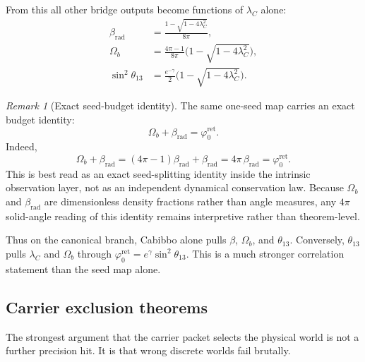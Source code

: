\documentclass[11pt,a4paper]{article}
\theoremstyle{definition}
\theoremstyle{remark}
\newtheorem*{remark}{Remark}
\newcommand{\phiz}{\varphi_0^{\mathrm{ret}}}
\begin{document}
From this all other bridge outputs become functions of $\lambda_C$ alone:
\begin{equation}
\label{eq:lambda-c-master}
\begin{aligned}
\beta_{\mathrm{rad}}&=\frac{1-\sqrt{1-4\lambda_C^2}}{8\pi},\\
\Omega_b&=\frac{4\pi-1}{8\pi}\bigl(1-\sqrt{1-4\lambda_C^2}\bigr),\\
\sin^2\theta_{13}&=\frac{e^{-\gamma}}{2}\bigl(1-\sqrt{1-4\lambda_C^2}\bigr).
\end{aligned}
\end{equation}
\begin{remark}[Exact seed-budget identity]
The same one-seed map carries an exact budget identity:
\begin{equation}
\label{eq:seed-budget-identity}
\Omega_b+\beta_{\mathrm{rad}}=\phiz.
\end{equation}
Indeed,
\[
\Omega_b+\beta_{\mathrm{rad}}
=(4\pi-1)\beta_{\mathrm{rad}}+\beta_{\mathrm{rad}}
=4\pi\,\beta_{\mathrm{rad}}
=\phiz.
\]
This is best read as an exact seed-splitting identity inside the intrinsic observation layer, not
as an independent dynamical conservation law.
Because $\Omega_b$ and $\beta_{\mathrm{rad}}$ are dimensionless density fractions rather than angle measures, any $4\pi$ solid-angle reading of this identity remains interpretive rather than theorem-level.
\end{remark}

Thus on the canonical branch, Cabibbo alone pulls $\beta$, $\Omega_b$, and $\theta_{13}$. Conversely, $\theta_{13}$ pulls $\lambda_C$ and $\Omega_b$ through $\phiz=e^\gamma\sin^2\theta_{13}$. This is a much stronger correlation statement than the seed map alone.

\subsection{Carrier exclusion theorems}

The strongest argument that the carrier packet selects the physical world is not a further precision hit. It is that wrong discrete worlds fail brutally.
\end{document}
